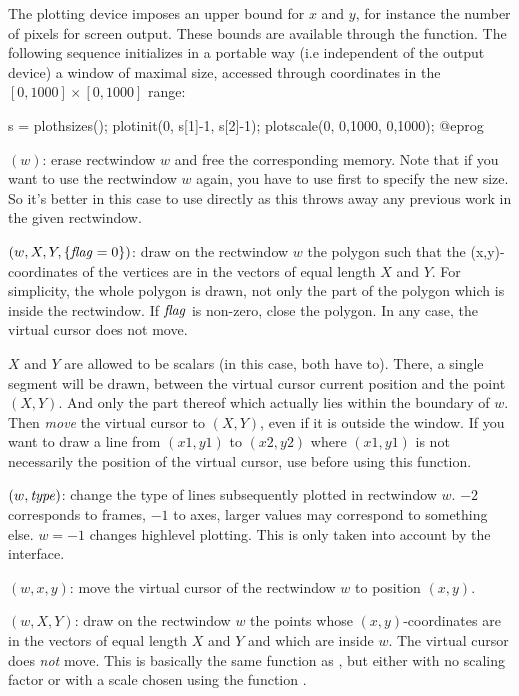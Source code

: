 The plotting device imposes an upper bound for $x$ and $y$, for instance the
number of pixels for screen output. These bounds are available through the
 function. The following sequence initializes in a portable
way (i.e independent of the output device) a window of maximal size, accessed
through coordinates in the $[0,1000] \times [0,1000]$ range:

\bprog
s = plothsizes();
plotinit(0, s[1]-1, s[2]-1);
plotscale(0, 0,1000, 0,1000);
@eprog

$(w)$: erase rectwindow $w$ and free the corresponding
memory. Note that if you want to use the rectwindow $w$ again, you have to
use  first to specify the new size. So it's better in this case
to use  directly as this throws away any previous work in the
given rectwindow.

$(w,X,Y,\{\hbox{\it f\kern0pt lag\/}=0\})$: draw on the rectwindow $w$
the polygon such that the (x,y)-coordinates of the vertices are in the
vectors of equal length $X$ and $Y$. For simplicity, the whole
polygon is drawn, not only the part of the polygon which is inside the
rectwindow. If $\hbox{\it f\kern0pt lag\/}$ is non-zero, close the polygon. In any case, the
virtual cursor does not move.

$X$ and $Y$ are allowed to be scalars (in this case, both have to).
There, a single segment will be drawn, between the virtual cursor current
position and the point $(X,Y)$. And only the part thereof which
actually lies within the boundary of $w$. Then \emph{move} the virtual cursor
to $(X,Y)$, even if it is outside the window. If you want to draw a
line from $(x1,y1)$ to $(x2,y2)$ where $(x1,y1)$ is not necessarily the
position of the virtual cursor, use  before using this
function.

$(w,\hbox{\it type\/})$: change the type of lines
subsequently plotted in rectwindow $w$.  $-2$ corresponds to
frames, $-1$ to axes, larger values may correspond to something else. $w =
-1$ changes highlevel plotting. This is only taken into account by the
 interface.

$(w,x,y)$: move the virtual cursor of the rectwindow $w$
to position $(x,y)$.

$(w,X,Y)$: draw on the rectwindow $w$ the
points whose $(x,y)$-coordinates are in the vectors of equal length $X$ and
$Y$ and which are inside $w$. The virtual cursor does \emph{not} move. This
is basically the same function as , but either with no scaling
factor or with a scale chosen using the function .

